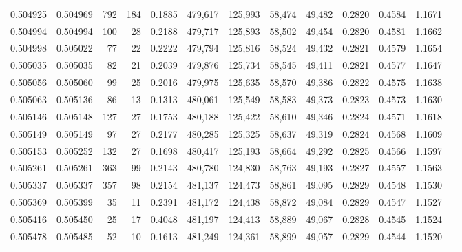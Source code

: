 \begin{tabular}{rrrrrrrrrrrrr}
0.504925 & 0.504969 &   792 &   184 &                                     0.1885 & 479,617 & 125,993 &  58,474 &  49,482 & 0.2820 & 0.4584 & 1.1671 \\
0.504994 & 0.504994 &   100 &    28 &                                     0.2188 & 479,717 & 125,893 &  58,502 &  49,454 & 0.2820 & 0.4581 & 1.1662 \\
0.504998 & 0.505022 &    77 &    22 &                                     0.2222 & 479,794 & 125,816 &  58,524 &  49,432 & 0.2821 & 0.4579 & 1.1654 \\
0.505035 & 0.505035 &    82 &    21 &                                     0.2039 & 479,876 & 125,734 &  58,545 &  49,411 & 0.2821 & 0.4577 & 1.1647 \\
0.505056 & 0.505060 &    99 &    25 &                                     0.2016 & 479,975 & 125,635 &  58,570 &  49,386 & 0.2822 & 0.4575 & 1.1638 \\
0.505063 & 0.505136 &    86 &    13 &                                     0.1313 & 480,061 & 125,549 &  58,583 &  49,373 & 0.2823 & 0.4573 & 1.1630 \\
0.505146 & 0.505148 &   127 &    27 &                                     0.1753 & 480,188 & 125,422 &  58,610 &  49,346 & 0.2824 & 0.4571 & 1.1618 \\
0.505149 & 0.505149 &    97 &    27 &                                     0.2177 & 480,285 & 125,325 &  58,637 &  49,319 & 0.2824 & 0.4568 & 1.1609 \\
0.505153 & 0.505252 &   132 &    27 &                                     0.1698 & 480,417 & 125,193 &  58,664 &  49,292 & 0.2825 & 0.4566 & 1.1597 \\
0.505261 & 0.505261 &   363 &    99 &                                     0.2143 & 480,780 & 124,830 &  58,763 &  49,193 & 0.2827 & 0.4557 & 1.1563 \\
0.505337 & 0.505337 &   357 &    98 &                                     0.2154 & 481,137 & 124,473 &  58,861 &  49,095 & 0.2829 & 0.4548 & 1.1530 \\
0.505369 & 0.505399 &    35 &    11 &                                     0.2391 & 481,172 & 124,438 &  58,872 &  49,084 & 0.2829 & 0.4547 & 1.1527 \\
0.505416 & 0.505450 &    25 &    17 &                                     0.4048 & 481,197 & 124,413 &  58,889 &  49,067 & 0.2828 & 0.4545 & 1.1524 \\
0.505478 & 0.505485 &    52 &    10 &                                     0.1613 & 481,249 & 124,361 &  58,899 &  49,057 & 0.2829 & 0.4544 & 1.1520 \\

\end{tabular}
